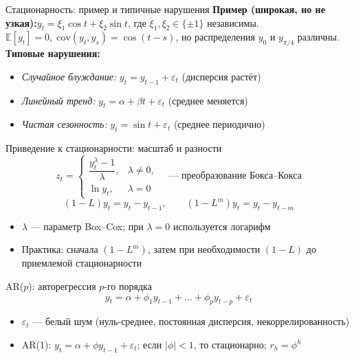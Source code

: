 \documentclass[aspectratio=1610,12pt]{beamer}
\begin{document}
\begin{frame}{Стационарность: пример и типичные нарушения}
\small
\textbf{Пример (широкая, но не узкая):}\quad $y_t=\xi_1\cos t+\xi_2\sin t$, где $\xi_1,\xi_2\in\{\pm1\}$ независимы.\\
$\mathbb{E}[y_t]=0,\;\mathrm{cov}(y_t,y_s)=\cos(t-s)$, но распределения $y_0$ и $y_{\pi/4}$ различны.\\[0.45em]
\textbf{Типовые нарушения:}
\begin{itemize}
  \item \emph{Случайное блуждание:} $y_t=y_{t-1}+\varepsilon_t$ (дисперсия растёт)
  \item \emph{Линейный тренд:} $y_t=\alpha+\beta t+\varepsilon_t$ (среднее меняется)
  \item \emph{Чистая сезонность:} $y_t=\sin t+\varepsilon_t$ (среднее периодично)
\end{itemize}
\end{frame}

\begin{frame}{Приведение к стационарности: масштаб и разности}
\small
\[
z_t=
\begin{cases}
\dfrac{y_t^{\lambda}-1}{\lambda}, & \lambda\neq 0,\\[4pt]
\ln y_t, & \lambda=0
\end{cases}
\quad\text{— преобразование Бокса–Кокса}
\]
\[
(1-L)y_t=y_t-y_{t-1}, \qquad (1-L^m)y_t=y_t-y_{t-m}
\]
\begin{itemize}
  \item $\lambda$ — параметр Box–Cox; при $\lambda=0$ используется логарифм
  \item Практика: сначала $(1-L^m)$, затем при необходимости $(1-L)$ до приемлемой стационарности
\end{itemize}
\end{frame}

\begin{frame}{AR($p$): авторегрессия $p$-го порядка}
\[
y_t = \alpha + \phi_1 y_{t-1} + \dots + \phi_p y_{t-p} + \varepsilon_t
\]
\begin{itemize}
  \item $\varepsilon_t$ — белый шум (нуль-среднее, постоянная дисперсия, некоррелированность)
  \item AR(1): $y_t=\alpha+\phi y_{t-1}+\varepsilon_t$;\; если $|\phi|<1$, то стационарно;\; $r_h=\phi^h$
\end{itemize}
\end{frame}
\end{document}
